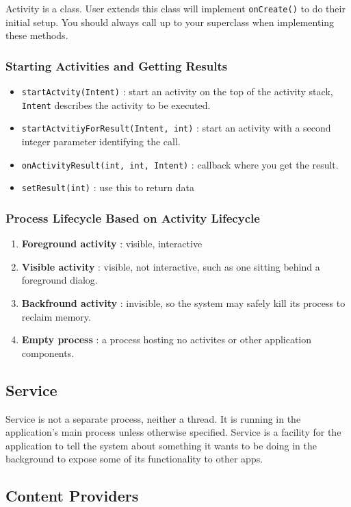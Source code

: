 Activity is a class. User extends this class will implement \texttt{onCreate()}
to do their initial setup. You should always call up to your superclass when
implementing these methods.

\subsubsection{Starting Activities and Getting Results}

\begin{itemize}
\item \texttt{startActvity(Intent)} : start an activity on the top of the
  activity stack, \texttt{Intent} describes the activity to be executed.
\item \texttt{startActvitiyForResult(Intent, int)} : start an activity with a
  second integer parameter identifying the call.
\item \texttt{onActivityResult(int, int, Intent)} : callback where you get the
  result.
\item \texttt{setResult(int)} : use this to return data
\end{itemize}

\subsubsection{Process Lifecycle Based on Activity Lifecycle}
\begin{enumerate}
\item \textbf{Foreground activity} : visible, interactive
\item \textbf{Visible activity} : visible, not interactive, such as one sitting
  behind a foreground dialog.
\item \textbf{Backfround activity} : invisible, so the system may safely kill
  its process to reclaim memory.
\item \textbf{Empty process} : a process hosting no activites or other
  application components.
\end{enumerate} 


\subsection{Service}


Service is not a separate process, neither a thread. It is running in the
application's main process unless otherwise specified. Service is a facility for
the application to tell the system about something it wants to be doing in the
background to expose some of its functionality to other apps.



\subsection{Content Providers}








  




